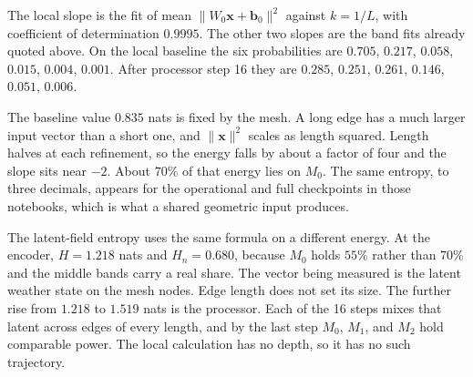 \documentclass[11pt]{article}
\begin{document}
The local slope is the fit of mean \(\|W_0\mathbf{x}+\mathbf{b}_0\|^2\) against \(k = 1/L\), with coefficient of determination \(0.9995\). The other two slopes are the band fits already quoted above. On the local baseline the six probabilities are \(0.705\), \(0.217\), \(0.058\), \(0.015\), \(0.004\), \(0.001\). After processor step 16 they are \(0.285\), \(0.251\), \(0.261\), \(0.146\), \(0.051\), \(0.006\).

The baseline value \(0.835\) nats is fixed by the mesh. A long edge has a much larger input vector than a short one, and \(\|\mathbf{x}\|^2\) scales as length squared. Length halves at each refinement, so the energy falls by about a factor of four and the slope sits near \(-2\). About \(70\%\) of that energy lies on \(M_0\). The same entropy, to three decimals, appears for the operational and full checkpoints in those notebooks, which is what a shared geometric input produces.

The latent-field entropy uses the same formula on a different energy. At the encoder, \(H = 1.218\) nats and \(H_n = 0.680\), because \(M_0\) holds \(55\%\) rather than \(70\%\) and the middle bands carry a real share. The vector being measured is the latent weather state on the mesh nodes. Edge length does not set its size. The further rise from \(1.218\) to \(1.519\) nats is the processor. Each of the 16 steps mixes that latent across edges of every length, and by the last step \(M_0\), \(M_1\), and \(M_2\) hold comparable power. The local calculation has no depth, so it has no such trajectory.
\end{document}
